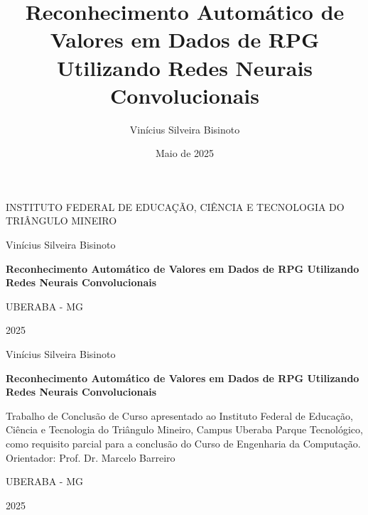 \documentclass[12pt]{article}
\title{Reconhecimento Automático de Valores em Dados de RPG Utilizando Redes Neurais Convolucionais}
\author{Vinícius Silveira Bisinoto}
\date{Maio de 2025}
\begin{document}
\begin{titlepage}
    \centering
    {\scshape\Large INSTITUTO FEDERAL DE EDUCAÇÃO, CIÊNCIA E TECNOLOGIA DO TRIÂNGULO MINEIRO \par}
    \vfill
    {\Large Vinícius Silveira Bisinoto\par}
    \vfill
    {\bfseries\Large Reconhecimento Automático de Valores em Dados de RPG Utilizando Redes Neurais Convolucionais\par}
    \vfill
    {\large UBERABA - MG\par}
    {\large 2025\par}
\end{titlepage}

\begin{titlepage}
    \centering
    {\Large Vinícius Silveira Bisinoto\par}
    \vspace{1.5cm}
    {\bfseries\Large Reconhecimento Automático de Valores em Dados de RPG Utilizando Redes Neurais Convolucionais\par}
    \vfill
    \begin{flushright}
        \begin{minipage}{0.5\textwidth}
            Trabalho de Conclusão de Curso apresentado ao Instituto Federal de Educação, 
            Ciência e Tecnologia do Triângulo Mineiro, Campus Uberaba Parque Tecnológico, 
            como requisito parcial para a conclusão do Curso de Engenharia da Computação.\\
            Orientador: Prof. Dr. Marcelo Barreiro
        \end{minipage}
    \end{flushright}
    \vfill
    {\large UBERABA - MG\par}
    {\large2025\par}
\end{titlepage}

\tableofcontents
\newpage








\end{document}
